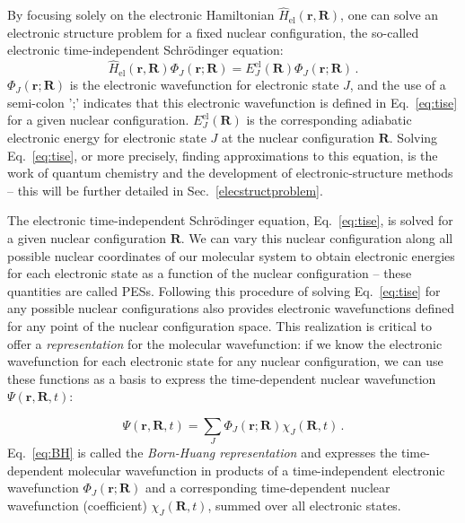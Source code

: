 \documentclass[9pt,bestpractices]{livecoms}
\begin{document}
By focusing solely on the electronic Hamiltonian $\hat{H}_{\text{el}}(\mathbf{r},\mathbf{R})$, one can solve an electronic structure problem for a fixed nuclear configuration, the so-called electronic time-independent Schr\"{o}dinger equation:
\begin{equation}
\hat{H}_{\text{el}}(\mathbf{r},\mathbf{R}) \Phi_J(\mathbf{r};\mathbf{R}) = E^{\text{el}}_{J}(\mathbf{R})\Phi_J(\mathbf{r};\mathbf{R}) \, .
\label{eq:tise}
\end{equation}
$\Phi_J(\mathbf{r};\mathbf{R})$ is the electronic wavefunction for electronic state $J$, and the use of a semi-colon ';' indicates that this electronic wavefunction is defined in Eq.~\eqref{eq:tise} for a given nuclear configuration.  $E^{\text{el}}_{J}(\mathbf{R})$ is the corresponding adiabatic electronic energy for electronic state $J$ at the nuclear configuration $\mathbf{R}$. Solving Eq.~\ref{eq:tise}, or more precisely, finding approximations to this equation, is the work of quantum chemistry and the development of electronic-structure methods -- this will be further detailed in Sec.~\ref{elecstructproblem}.

The electronic time-independent Schr\"{o}dinger equation, Eq.~\eqref{eq:tise}, is solved for a given nuclear configuration $\mathbf{R}$. We can vary this nuclear configuration along all possible nuclear coordinates of our molecular system to obtain electronic energies for each electronic state as a function of the nuclear configuration -- these quantities are called PESs. Following this procedure of solving Eq.~\ref{eq:tise} for any possible nuclear configurations also provides electronic wavefunctions defined for any point of the nuclear configuration space. This realization is critical to offer a \textit{representation} for the molecular wavefunction: if we know the electronic wavefunction for each electronic state for any nuclear configuration, we can use these functions as a basis to express the time-dependent nuclear wavefunction $\Psi(\mathbf{r},\mathbf{R},t)$:

\begin{equation}
\Psi(\mathbf{r},\mathbf{R},t)=\sum_J\Phi_J(\mathbf{r};\mathbf{R})\chi_J(\mathbf{R},t) \, .
\label{eq:BH}
\end{equation}
Eq.~\eqref{eq:BH} is called the \textit{Born-Huang representation} and expresses the time-dependent molecular wavefunction in products of a time-independent electronic wavefunction $\Phi_J(\mathbf{r};\mathbf{R})$ and a corresponding time-dependent nuclear wavefunction (coefficient) $\chi_J(\mathbf{R},t)$, summed over all electronic states. 
\end{document}

